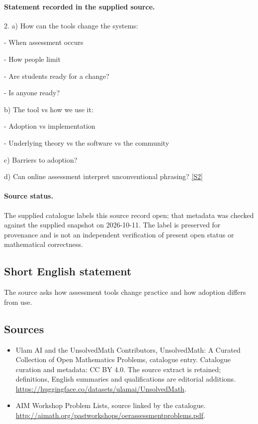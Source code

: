 \documentclass[11pt]{article}
\begin{document}
\paragraph{Statement recorded in the supplied source.}
2. a) How can the tools change the systems:

- When assessment occurs

- How people limit

- Are students ready for a change?

- Is anyone ready?

b) The tool vs how we use it:

- Adoption vs implementation

- Underlying theory vs the software vs the community

c) Barriers to adoption?

d) Can online assessment interpret unconventional phrasing? \href{http://aimath.org/pastworkshops/oerassessmentproblems.pdf}{[S2]}
\paragraph{Source status.}
The supplied catalogue labels this source record open; that metadata was checked against the supplied snapshot on 2026-10-11. The label is preserved for provenance and is not an independent verification of present open status or mathematical correctness.
\subsection{Short English statement}
The source asks how assessment tools change practice and how adoption differs from use.
\subsection{Sources}
\begin{itemize}
\item[S1] Ulam AI and the UnsolvedMath Contributors, UnsolvedMath: A Curated Collection of Open Mathematics Problems, catalogue entry. Catalogue curation and metadata: CC BY 4.0. The source extract is retained; definitions, English summaries and qualifications are editorial additions.
\url{https://huggingface.co/datasets/ulamai/UnsolvedMath}.
\item[S2] AIM Workshop Problem Lists, source linked by the catalogue.
\url{http://aimath.org/pastworkshops/oerassessmentproblems.pdf}.
\end{itemize}
\end{document}
